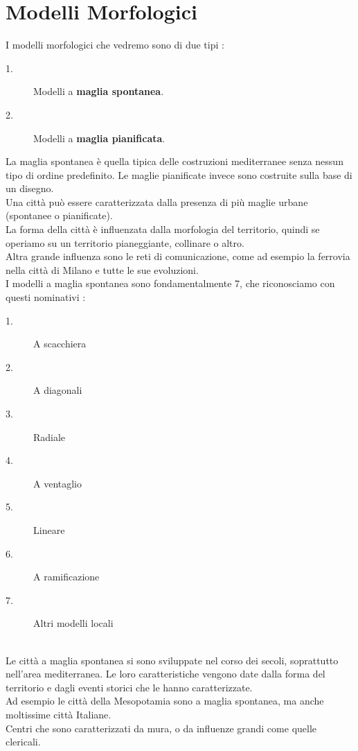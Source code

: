 \documentclass[a4paper,12pt, oneside]{book}
\begin{document}
  \section{Modelli Morfologici}
  I modelli morfologici che vedremo sono di due tipi :
  \begin{description}
  	\item [1.] Modelli a \textbf{maglia spontanea}.
  	\item [2.] Modelli a \textbf{maglia pianificata}.
  \end{description}
  La maglia spontanea è quella tipica delle costruzioni mediterranee senza nessun tipo di ordine predefinito. Le maglie pianificate invece sono costruite sulla base di un disegno.\\
  Una città può essere caratterizzata dalla presenza di più maglie urbane (spontanee o pianificate).\\
  La forma della città è influenzata dalla morfologia del territorio, quindi se operiamo su un territorio pianeggiante, collinare o altro.\\
  Altra grande influenza sono le reti di comunicazione, come ad esempio la ferrovia nella città di Milano e tutte le sue evoluzioni.\\
  I modelli a maglia spontanea sono fondamentalmente 7, che riconosciamo con questi nominativi : \\
  \begin{multicols}{2}
   \begin{description}
  	\item [1.] A scacchiera
  	\item [2.] A diagonali
  	\item [3.] Radiale
  	\item [4.] A ventaglio
  	\item [5.] Lineare
  	\item [6.] A ramificazione
  	\item [7.] Altri modelli locali
   \end{description}
  \end{multicols}
  \leavevmode\\
  Le città a maglia spontanea si sono sviluppate nel corso dei secoli, soprattutto nell'area mediterranea. Le loro caratteristiche vengono date dalla forma del territorio e dagli eventi storici che le hanno caratterizzate.\\
  Ad esempio le città della Mesopotamia sono a maglia spontanea, ma anche moltissime città Italiane.\\
  Centri che sono caratterizzati da mura, o da influenze grandi come quelle clericali.\\
\end{document}
